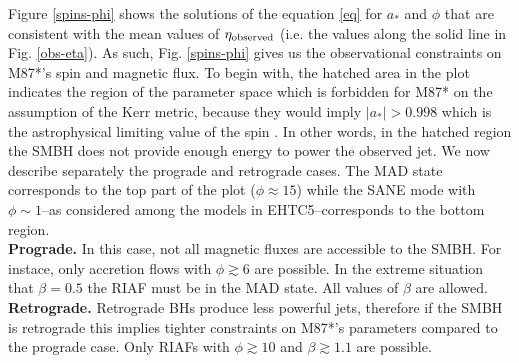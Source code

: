 \documentclass[twocolumn, linenumbers]{aastex62} %
\begin{document}
Figure \ref{spins-phi} shows the solutions of the equation \ref{eq} for $a_*$ and $\phi$ that are consistent with the mean values of $\eta_{\rm observed}$ (i.e. the values along the solid line in Fig. \ref{obs-eta}). %
As such, Fig. \ref{spins-phi} gives us the observational constraints on M87*'s spin and magnetic flux. To begin with, the hatched area in the plot indicates the region of the parameter space which is forbidden for M87* on the assumption of the Kerr metric, because they would imply $|a_*| > 0.998$ which is the astrophysical limiting value of the spin \citep{Thorne1974}. In other words, in the hatched region the SMBH does not provide enough energy to power the observed jet. We now describe separately the prograde and retrograde cases. The MAD state corresponds to the top part of the plot ($\phi \approx 15$) while the SANE mode with $\phi \sim 1$--as considered among the models in EHTC5--corresponds to the bottom region. \\
%
\textbf{Prograde.} In this case, not all magnetic fluxes are accessible to the SMBH. For instace, only accretion flows with $\phi \gtrsim 6$ are possible. In the extreme situation that $\beta=0.5$  the RIAF must be in the MAD state. All values of $\beta$ are allowed. \\
\textbf{Retrograde.} Retrograde BHs produce less powerful jets, therefore if the SMBH is retrograde this implies tighter constraints on M87*'s parameters compared to the prograde case. Only RIAFs with  $\phi \gtrsim 10$ and $\beta \gtrsim 1.1$ are possible.  \\
\end{document}
